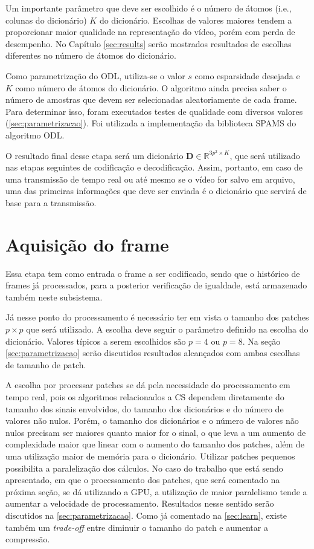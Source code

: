 \documentclass[cic,tc]{iiufrgs}
\newcommand{\mat}[1]{\bm{#1}}
\begin{document}
Um importante parâmetro que deve ser escolhido é o número de átomos (i.e., colunas do dicionário) $K$ do dicionário.
Escolhas de valores maiores tendem a proporcionar maior qualidade na representação do vídeo,
porém com perda de desempenho. No Capítulo \ref{sec:results} serão mostrados resultados
de escolhas diferentes no número de átomos do dicionário.

Como parametrização do ODL, utiliza-se o valor $s$ como esparsidade desejada e
$K$ como número de átomos do dicionário.
O algoritmo ainda precisa saber o número de amostras que devem ser selecionadas aleatoriamente
de cada frame.
Para determinar isso, foram executados testes de qualidade com diversos valores
(\autoref{sec:parametrizacao}).
Foi utilizada a implementação da biblioteca SPAMS \cite{SPAMS} do algoritmo ODL.

O resultado final desse etapa será um dicionário $\mat{D} \in \mathbb{R}^{3p^2 \times K}$,
que será utilizado nas etapas seguintes de codificação e decodificação.
Assim, portanto, em caso de uma transmissão de tempo real ou até mesmo se o vídeo for salvo em arquivo,
uma das primeiras informações que deve ser enviada é o dicionário que servirá de base
para a transmissão.


\section{Aquisição do frame}
\label{sec:frameaquisition}
Essa etapa tem como entrada o frame a ser codificado, sendo que o histórico de frames já
processados, para a posterior verificação de igualdade, está armazenado também neste
subsistema.

Já nesse ponto do processamento é necessário ter em vista o tamanho dos patches $p\times p$
que será utilizado. A escolha deve seguir o parâmetro definido na escolha do dicionário.
Valores típicos a serem escolhidos são $p=4$ ou $p=8$. Na seção \ref{sec:parametrizacao} serão 
discutidos resultados alcançados com ambas escolhas de tamanho de patch.

A escolha por processar patches se dá pela necessidade do processamento em tempo real, pois 
os algoritmos relacionados a CS dependem diretamente do tamanho
dos sinais envolvidos, do tamanho dos dicionários e do número de valores não nulos.
Porém, o tamanho dos dicionários e o número de valores não nulos precisam ser maiores quanto maior for 
o sinal, o que leva a um aumento de complexidade maior que linear com o aumento do tamanho dos
patches, além de uma utilização maior de memória para o dicionário.
Utilizar patches pequenos possibilita a paralelização dos cálculos.
No caso do trabalho que está sendo apresentado, em que o processamento dos patches, que será 
comentado na próxima seção, se dá utilizando a GPU, a utilização de maior 
paralelismo tende a aumentar a velocidade de processamento.
Resultados nesse sentido serão discutidos na \autoref{sec:parametrizacao}.
Como já comentado na \autoref{sec:learn}, existe também um \textit{trade-off} entre 
diminuir o tamanho do patch e aumentar a compressão.
\end{document}
